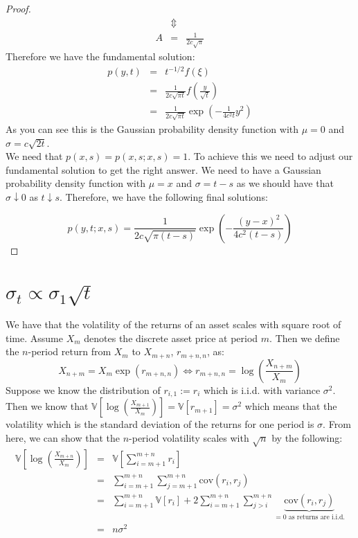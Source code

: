 \documentclass[11pt]{article}
\theoremstyle{definition}
\newcommand{\brac}[1]{\left(#1\right)}
\newcommand{\V}[1]{\mathbb{V}\left[#1\right]}
\begin{document}
\begin{proof}
\begin{eqnarray*}
			&\Updownarrow&\\
			A &=& \frac{1}{2c\sqrt{\pi}}			
		\end{eqnarray*}
		Therefore we have the fundamental solution:
		\begin{eqnarray*}
			p\brac{y,t} &=& t^{-1/2}f\brac{\xi}\\
			&=& \frac{1}{2c\sqrt{\pi t}}f\brac{\frac{y}{\sqrt{t}}}\\
			&=& \frac{1}{2c\sqrt{\pi t}}\exp\brac{-\frac{1}{4c^2t}y^2}
		\end{eqnarray*}
		As you can see this is the Gaussian probability density function with $\mu = 0$ and $\sigma = c\sqrt{2t}$.\\
		
		We need that $p\brac{x,s} = p\brac{x,s;x,s} = 1$. To achieve this we need to adjust our fundamental solution to get the right answer. We need to have a Gaussian probability density function with $\mu = x$ and $\sigma = t-s$ as we should have that $\sigma\downarrow 0 $ as $t\downarrow s$. Therefore, we have the following final solutions:
		
		$$p\brac{y,t;x,s} = \frac{1}{2c\sqrt{\pi\brac{t-s}}}\exp\brac{-\frac{\brac{y-x}^2}{4c^2\brac{t-s}}}$$
		
	\end{proof}
	
\section{$ \sigma_t \propto \sigma_1 \sqrt{t} $}
	
	We have that the volatility of the returns of an asset scales with square root of time. Assume $X_m$ denotes the discrete asset price at period $m$. Then we define the $n$-period return from $X_m$ to $X_{m+n}$, $r_{m+n,n}$, as: 
	$$ X_{n+m} = X_m \exp\brac{r_{m+n,n}} \Leftrightarrow r_{m+n,n} = \log\brac{\frac{X_{n+m}}{X_m}} $$
	Suppose we know the distribution of $r_{i,1}:=r_i$ which is i.i.d. with variance $\sigma^2$. Then we know that $\V{\log\brac{\frac{X_{m+1}}{X_m}}} = \V{r_{m+1}} = \sigma^2$ which means that the volatility which is the standard deviation of the returns for one period is $\sigma$. From here, we can show that the $n$-period volatility scales with $\sqrt{n}$ by the following:
	\begin{eqnarray*}
		\V{\log\brac{\frac{X_{m+n}}{X_m}}} &=& \V{\sum_{i=m+1}^{m+n}r_i}\\
		&=& \sum_{i=m+1}^{m+n}\sum_{j=m+1}^{m+n}\text{cov}\brac{r_i,r_j}\\
		&=& \sum_{i=m+1}^{m+n}\V{r_i} + 2\sum_{i=m+1}^{m+n}\sum_{j>i}^{m+n}\underbrace{\text{cov}\brac{r_i,r_j}}_{= 0 \text{ as returns are i.i.d.}}\\
		&=& n \sigma^2
	\end{eqnarray*}
\end{document}

